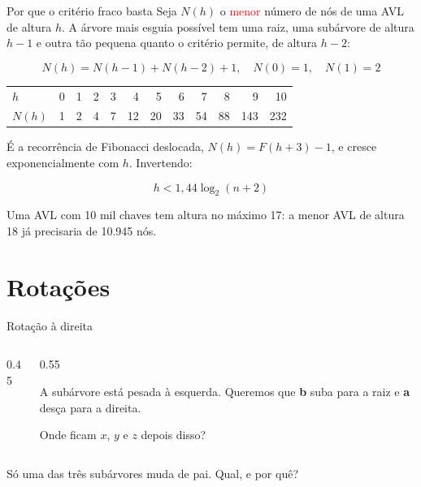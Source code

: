 \documentclass{beamer}
\newcommand{\tcr}[1]{\textcolor{red}{#1}}
\begin{document}
\begin{frame}{Por que o critério fraco basta}
  Seja $N(h)$ o \tcr{menor} número de nós de uma AVL de altura $h$. A árvore
  mais esguia possível tem uma raiz, uma subárvore de altura $h-1$ e outra tão
  pequena quanto o critério permite, de altura $h-2$:

  $$N(h) = N(h-1) + N(h-2) + 1, \quad N(0) = 1, \quad N(1) = 2$$

  \vspace{0.2cm}
  \begin{center}
    \footnotesize
    \begin{tabular}{lrrrrrrrrrrr}
      \toprule
      $h$ & 0 & 1 & 2 & 3 & 4 & 5 & 6 & 7 & 8 & 9 & 10 \\
      $N(h)$ & 1 & 2 & 4 & 7 & 12 & 20 & 33 & 54 & 88 & 143 & 232 \\
      \bottomrule
    \end{tabular}
  \end{center}

  \vspace{0.3cm}
  É a recorrência de Fibonacci deslocada, $N(h) = F(h+3) - 1$, e cresce
  exponencialmente com $h$. Invertendo:

  $$h < 1{,}44 \log_2 (n + 2)$$

  Uma AVL com 10 mil chaves tem altura no máximo 17: a menor AVL de altura 18
  já precisaria de 10.945 nós.
\end{frame}

\section{Rotações}

\begin{frame}{Rotação à direita}
  \begin{columns}
    \begin{column}{0.45\textwidth}
      \centering
    \end{column}
    \begin{column}{0.55\textwidth}
      \begin{block}{}
        A subárvore está pesada à esquerda. Queremos que \textbf{b} suba para a
        raiz e \textbf{a} desça para a direita.

        \vspace{0.3cm}
        Onde ficam $x$, $y$ e $z$ depois disso?
      \end{block}
    \end{column}
  \end{columns}

  \vspace{0.4cm}
  Só uma das três subárvores muda de pai. Qual, e por quê?
\end{frame}
\end{document}
